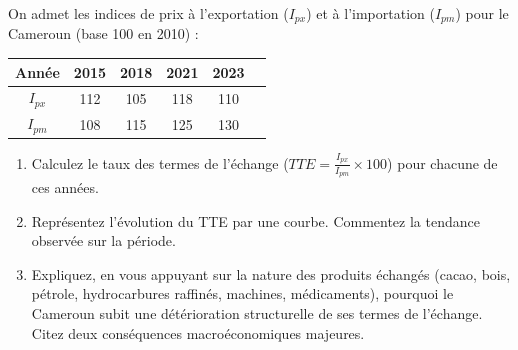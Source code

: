 \documentclass[11pt]{article}
\begin{document}
\begin{exercice}
\label{exo:termes}
On admet les indices de prix à l'exportation ($I_{px}$) et à l'importation ($I_{pm}$) pour le Cameroun (base 100 en 2010) :

\begin{center}
\begin{tabular}{cccccc}
\toprule
\textbf{Année} & 2015 & 2018 & 2021 & 2023 \\
\midrule
$I_{px}$ & 112 & 105 & 118 & 110 \\
$I_{pm}$ & 108 & 115 & 125 & 130 \\
\bottomrule
\end{tabular}
\end{center}

\begin{enumerate}
    \item Calculez le taux des termes de l'échange ($TTE = \frac{I_{px}}{I_{pm}} \times 100$) pour chacune de ces années.
    \item Représentez l'évolution du TTE par une courbe. Commentez la tendance observée sur la période.
    \item Expliquez, en vous appuyant sur la nature des produits échangés (cacao, bois, pétrole, hydrocarbures raffinés, machines, médicaments), pourquoi le Cameroun subit une détérioration structurelle de ses termes de l'échange. Citez deux conséquences macroéconomiques majeures.
\end{enumerate}
\end{exercice}
\end{document}
